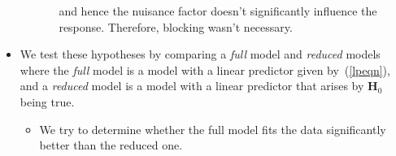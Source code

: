 \begin{itemize}
\begin{enumerate}[(1)]
\begin{itemize}
                                    and hence the nuisance factor doesn't significantly influence the response. Therefore, blocking wasn't necessary.
                        \end{itemize}
            \end{enumerate}
      \item We test these hypotheses by comparing a \emph{full} model and \emph{reduced} models where the \emph{full} model
            is a model with a linear predictor given by~(\ref{lpeqn}), and a \emph{reduced} model is a model with a linear predictor that arises by $ \mathbf{H}_0 $
            being true.
            \begin{itemize}
                  \item We try to determine whether the full model fits the data significantly better than the reduced one.
            \end{itemize}
\end{itemize}
